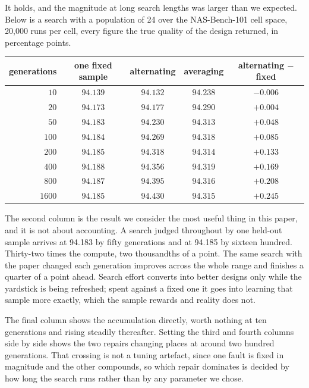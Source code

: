 \documentclass[11pt]{article}
\begin{document}
It holds, and the magnitude at long search lengths was larger than we expected. Below is a search with a
population of 24 over the NAS-Bench-101 cell space, 20,000 runs per cell, every figure the true quality of
the design returned, in percentage points.

\begin{center}
\begin{tabular}{rcccc}
\toprule
generations & one fixed sample & alternating & averaging & alternating $-$ fixed \\
\midrule
$10$    & $94.139$ & $94.132$ & $94.238$ & $-0.006$ \\
$20$    & $94.173$ & $94.177$ & $94.290$ & $+0.004$ \\
$50$    & $94.183$ & $94.230$ & $94.313$ & $+0.048$ \\
$100$   & $94.184$ & $94.269$ & $94.318$ & $+0.085$ \\
$200$   & $94.185$ & $94.318$ & $94.314$ & $+0.133$ \\
$400$   & $94.188$ & $94.356$ & $94.319$ & $+0.169$ \\
$800$   & $94.187$ & $94.395$ & $94.316$ & $+0.208$ \\
$1600$  & $94.185$ & $94.430$ & $94.315$ & $+0.245$ \\
\bottomrule
\end{tabular}
\end{center}

The second column is the result we consider the most useful thing in this paper, and it is not about
accounting. A search judged throughout by one held-out sample arrives at 94.183 by fifty generations and
at 94.185 by sixteen hundred. Thirty-two times the compute, two thousandths of a point. The same search
with the paper changed each generation improves across the whole range and finishes a quarter of a point
ahead. Search effort converts into better designs only while the yardstick is being refreshed; spent
against a fixed one it goes into learning that sample more exactly, which the sample rewards and reality
does not.

The final column shows the accumulation directly, worth nothing at ten generations and rising steadily
thereafter. Setting the third and fourth columns side by side shows the two repairs changing places at
around two hundred generations. That crossing is not a tuning artefact, since one fault is fixed in
magnitude and the other compounds, so which repair dominates is decided by how long the search runs
rather than by any parameter we chose.
\end{document}
